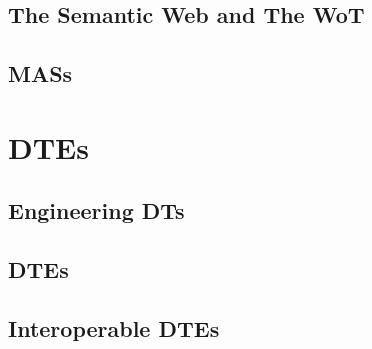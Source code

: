 \documentclass[12pt,a4paper,openright,twoside]{book}
\begin{document}


\chapter{The Semantic Web and The \acl{WoT}}
\label{chap:back:Web}




\chapter{\aclp{MAS}}
\label{chap:back:MAS}



\part{\aclp{DTE}}
\label{part:dte}

\chapter{Engineering \aclp{DT}}
\label{chap:dte:engineering-dt}



\chapter{\aclp{DTE}}
\label{chap:dte:dte}



\chapter{Interoperable \aclp{DTE}}
\label{chap:dte:hwodt}
\end{document}
